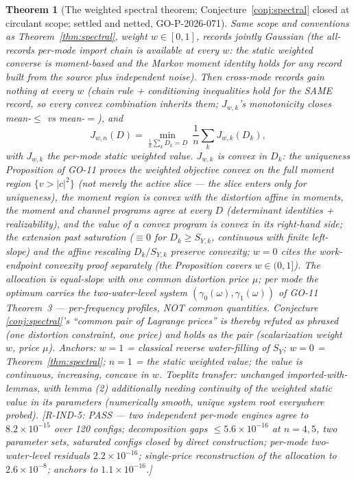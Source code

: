 ﻿\documentclass[11pt]{article}
\newtheorem{theorem}{Theorem}
\theoremstyle{remark}
\begin{document}
\begin{theorem}[The weighted spectral theorem; Conjecture~\ref{conj:spectral}
closed at circulant scope; settled and netted, GO-P-2026-071]
\label{thm:wspectral}
Same scope and conventions as Theorem~\ref{thm:spectral}, weight
$w\in[0,1]$, records jointly Gaussian (the all-records per-mode import
chain is available at every $w$: the static weighted converse is
moment-based and the Markov moment identity holds for any record built
from the source plus independent noise). Then cross-mode records gain
nothing at every $w$ (chain rule + conditioning inequalities hold for
the SAME record, so every convex combination inherits them;
$J_{w,k}$'s monotonicity closes mean-$\le$ vs mean-$=$), and
\[
J_{w,n}(D)=\min_{\frac1n\sum_kD_k=D}\ \frac1n\sum_kJ_{w,k}(D_k),
\]
with $J_{w,k}$ the per-mode static weighted value. $J_{w,k}$ is convex
in $D_k$: the uniqueness Proposition of GO-11 proves the weighted
objective convex on the \emph{full} moment region $\{v>|c|^2\}$ (not
merely the active slice --- the slice enters only for uniqueness), the
moment region is convex with the distortion affine in moments, the
moment and channel programs agree at every $D$ (determinant identities
+ realizability), and the value of a convex program is convex in its
right-hand side; the extension past saturation ($\equiv0$ for
$D_k\ge S_{Y,k}$, continuous with finite left-slope) and the affine
rescaling $D_k/S_{Y,k}$ preserve convexity; $w=0$ cites the
work-endpoint convexity proof separately (the Proposition covers
$w\in(0,1]$). The allocation is equal-slope with \emph{one} common
distortion price $\mu$; per mode the optimum carries the two-water-level
system $(\gamma_0(\omega),\gamma_1(\omega))$ of GO-11 Theorem~3 ---
per-frequency profiles, NOT common quantities. Conjecture
\ref{conj:spectral}'s ``common pair of Lagrange prices'' is thereby
\emph{refuted as phrased} (one distortion constraint, one price) and
holds as the pair (scalarization weight $w$, price $\mu$). Anchors:
$w{=}1$ = classical reverse water-filling of $S_Y$; $w{=}0$ =
Theorem~\ref{thm:spectral}; $n{=}1$ = the static weighted value; the
value is continuous, increasing, concave in $w$. Toeplitz transfer:
unchanged imported-with-lemmas, with lemma (2) additionally needing
continuity of the weighted static value in its parameters (numerically
smooth, unique system root everywhere probed). [R-IND-5: PASS ---
two independent per-mode engines agree to $8.2\times10^{-15}$ over 120
configs; decomposition gaps $\le5.6\times10^{-16}$ at $n=4,5$, two
parameter sets, saturated configs closed by direct construction;
per-mode two-water-level residuals $2.2\times10^{-16}$; single-price
reconstruction of the allocation to $2.6\times10^{-8}$; anchors to
$1.1\times10^{-16}$.]
\end{theorem}
\end{document}

